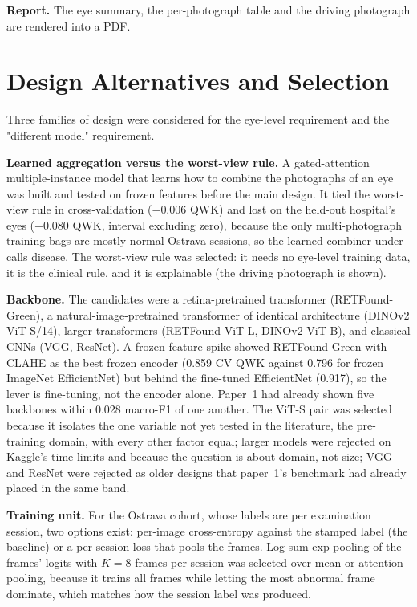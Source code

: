 \textbf{Report.} The eye summary, the per-photograph table and the driving photograph are rendered into a PDF.

\section{Design Alternatives and Selection}
Three families of design were considered for the eye-level requirement and the "different model" requirement.

\textbf{Learned aggregation versus the worst-view rule.} A gated-attention multiple-instance model that learns how to combine the photographs of an eye was built and tested on frozen features before the main design. It tied the worst-view rule in cross-validation ($-0.006$ QWK) and lost on the held-out hospital's eyes ($-0.080$ QWK, interval excluding zero), because the only multi-photograph training bags are mostly normal Ostrava sessions, so the learned combiner under-calls disease. The worst-view rule was selected: it needs no eye-level training data, it is the clinical rule, and it is explainable (the driving photograph is shown).

\textbf{Backbone.} The candidates were a retina-pretrained transformer (RETFound-Green), a natural-image-pretrained transformer of identical architecture (DINOv2 ViT-S/14), larger transformers (RETFound ViT-L, DINOv2 ViT-B), and classical CNNs (VGG, ResNet). A frozen-feature spike showed RETFound-Green with CLAHE as the best frozen encoder (0.859 CV QWK against 0.796 for frozen ImageNet EfficientNet) but behind the fine-tuned EfficientNet (0.917), so the lever is fine-tuning, not the encoder alone. Paper~1 had already shown five backbones within 0.028 macro-F1 of one another. The ViT-S pair was selected because it isolates the one variable not yet tested in the literature, the pre-training domain, with every other factor equal; larger models were rejected on Kaggle's time limits and because the question is about domain, not size; VGG and ResNet were rejected as older designs that paper~1's benchmark had already placed in the same band.

\textbf{Training unit.} For the Ostrava cohort, whose labels are per examination session, two options exist: per-image cross-entropy against the stamped label (the baseline) or a per-session loss that pools the frames. Log-sum-exp pooling of the frames' logits with $K=8$ frames per session was selected over mean or attention pooling, because it trains all frames while letting the most abnormal frame dominate, which matches how the session label was produced.

